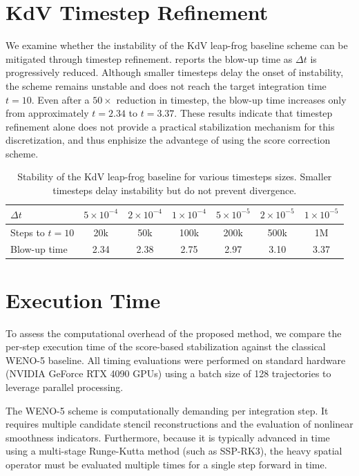 \documentclass[letterpaper]{article} %
\begin{document}
\section{KdV Timestep Refinement}
\label{app:kdv_refine}

We examine whether the instability of the KdV leap-frog baseline
scheme can be mitigated through timestep refinement. 
reports the blow-up time as $\Delta t$ is progressively reduced. Although
smaller timesteps delay the onset of instability, the scheme remains unstable
and does not reach the target integration time $t=10$. Even after a $50\times$
reduction in timestep, the blow-up time increases only from approximately $t=2.34$ to
$t=3.37$. These results indicate that timestep refinement alone does not
provide a practical stabilization mechanism for this discretization, and thus enphisize the advantege of using the score correction scheme.

\begin{table}[h]
\centering
\caption{Stability of the KdV leap-frog baseline for various timesteps sizes. Smaller timesteps delay instability but do not prevent divergence.}
\label{tab:kdv_refine}
\begin{tabular}{lcccccc}
\toprule
$\Delta t$
& $5{\times}10^{-4}$
& $2{\times}10^{-4}$
& $1{\times}10^{-4}$
& $5{\times}10^{-5}$
& $2{\times}10^{-5}$
& $1{\times}10^{-5}$ \\
\midrule
Steps to $t=10$
& 20k
& 50k
& 100k
& 200k
& 500k
& 1M \\
Blow-up time
& 2.34
& 2.38
& 2.75
& 2.97
& 3.10
& 3.37 \\
\bottomrule
\end{tabular}
\end{table}



\section{Execution Time}
\label{app:timing}

To assess the computational overhead of the proposed method, we compare the per-step execution time of the score-based stabilization against the classical WENO-5 \citep{jiang1996efficient} baseline. All timing evaluations were performed on standard hardware (NVIDIA GeForce RTX 4090 GPUs) using a batch size of 128 trajectories to leverage parallel processing.

The WENO-5 scheme is computationally demanding per integration step. It requires multiple candidate stencil reconstructions and the evaluation of nonlinear smoothness indicators. Furthermore, because it is typically advanced in time using a multi-stage Runge-Kutta method (such as SSP-RK3), the heavy spatial operator must be evaluated multiple times for a single step forward in time. 
\end{document}
